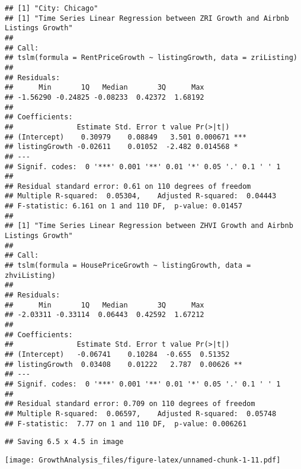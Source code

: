\documentclass[
]{article}
\begin{document}
\begin{verbatim}
## [1] "City: Chicago"
## [1] "Time Series Linear Regression between ZRI Growth and Airbnb Listings Growth"
## 
## Call:
## tslm(formula = RentPriceGrowth ~ listingGrowth, data = zriListing)
## 
## Residuals:
##      Min       1Q   Median       3Q      Max 
## -1.56290 -0.24825 -0.08233  0.42372  1.68192 
## 
## Coefficients:
##               Estimate Std. Error t value Pr(>|t|)    
## (Intercept)    0.30979    0.08849   3.501 0.000671 ***
## listingGrowth -0.02611    0.01052  -2.482 0.014568 *  
## ---
## Signif. codes:  0 '***' 0.001 '**' 0.01 '*' 0.05 '.' 0.1 ' ' 1
## 
## Residual standard error: 0.61 on 110 degrees of freedom
## Multiple R-squared:  0.05304,    Adjusted R-squared:  0.04443 
## F-statistic: 6.161 on 1 and 110 DF,  p-value: 0.01457
## 
## [1] "Time Series Linear Regression between ZHVI Growth and Airbnb Listings Growth"
## 
## Call:
## tslm(formula = HousePriceGrowth ~ listingGrowth, data = zhviListing)
## 
## Residuals:
##      Min       1Q   Median       3Q      Max 
## -2.03311 -0.33114  0.06443  0.42592  1.67212 
## 
## Coefficients:
##               Estimate Std. Error t value Pr(>|t|)   
## (Intercept)   -0.06741    0.10284  -0.655  0.51352   
## listingGrowth  0.03408    0.01222   2.787  0.00626 **
## ---
## Signif. codes:  0 '***' 0.001 '**' 0.01 '*' 0.05 '.' 0.1 ' ' 1
## 
## Residual standard error: 0.709 on 110 degrees of freedom
## Multiple R-squared:  0.06597,    Adjusted R-squared:  0.05748 
## F-statistic:  7.77 on 1 and 110 DF,  p-value: 0.006261
\end{verbatim}

\begin{verbatim}
## Saving 6.5 x 4.5 in image
\end{verbatim}

\texttt{[image: GrowthAnalysis\_files/figure-latex/unnamed-chunk-1-11.pdf]}
\end{document}
